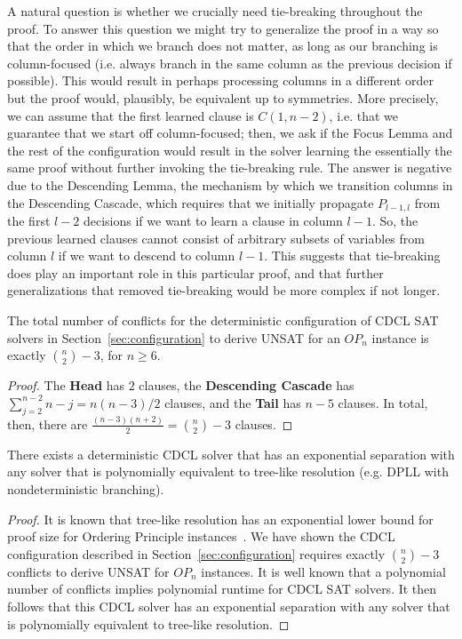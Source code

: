 \documentclass[a4paper,UKenglish,cleveref, autoref, thm-restate]{lipics-v2021}
\begin{document}
A natural question is whether we crucially need tie-breaking throughout the proof. To answer this question we might try to generalize the proof in a way so that the order in which we branch does not matter, as long as our branching is column-focused (i.e. always branch in the same column as the previous decision if possible). This would result in perhaps processing columns in a different order but the proof would, plausibly, be equivalent up to symmetries. More precisely, we can assume that the first learned clause is $C(1, n - 2)$, i.e. that we guarantee that we start off column-focused; then, we ask if the Focus Lemma and the rest of the configuration would result in the solver learning the essentially the same proof without further invoking the tie-breaking rule. The answer is negative due to the Descending Lemma, the mechanism by which we transition columns in the Descending Cascade, which requires that we initially propagate $P_{l - 1, l}$ from the first $l - 2$ decisions if we want to learn a clause in column $l - 1$. So, the previous learned clauses cannot consist of arbitrary subsets of variables from column $l$ if we want to descend to column $l - 1$.
This suggests that tie-breaking does play an important role in this particular proof, and that further generalizations that removed tie-breaking would be more complex if not longer.

\newpage

\begin{theorem}
The total number of conflicts for the deterministic configuration of CDCL SAT solvers in Section~\ref{sec:configuration} to derive UNSAT for an $OP_n$ instance is exactly $\binom{n}{2} - 3$, for $n \geq 6$.
\end{theorem}

\begin{proof}
    The \textbf{Head} has $2$ clauses, the \textbf{Descending Cascade} has $\sum_{j = 2}^{n - 2} n - j = n (n - 3) / 2$ clauses, and the \textbf{Tail} has $n - 5$ clauses. In total, then, there are $\frac{(n - 3) (n + 2)}{2} = \binom{n}{2} - 3$ clauses. 
\end{proof}


\begin{corollary}
There exists a deterministic CDCL solver that has an exponential separation with any solver that is polynomially equivalent to tree-like resolution (e.g. DPLL with nondeterministic branching). 
\end{corollary}

\begin{proof}
It is known that tree-like resolution has an exponential lower bound for proof size for Ordering Principle instances~\cite{bonet-galesi}. We have shown the CDCL configuration described in Section~\ref{sec:configuration} requires exactly $\binom{n}{2} - 3$ conflicts to derive UNSAT for $OP_n$ instances. It is well known that a polynomial number of conflicts implies polynomial runtime for CDCL SAT solvers. It then follows that this CDCL solver has an exponential separation with any solver that is polynomially equivalent to tree-like resolution.
\end{proof}
\end{document}
